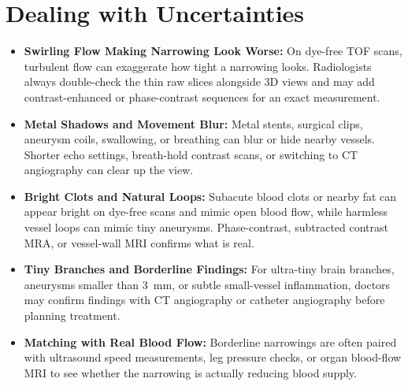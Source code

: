 \section{Dealing with Uncertainties}
\begin{itemize}
\item \textbf{Swirling Flow Making Narrowing Look Worse:} On dye-free TOF scans, turbulent flow can exaggerate how tight a narrowing looks. Radiologists always double-check the thin raw slices alongside 3D views and may add contrast-enhanced or phase-contrast sequences for an exact measurement.
\item \textbf{Metal Shadows and Movement Blur:} Metal stents, surgical clips, aneurysm coils, swallowing, or breathing can blur or hide nearby vessels. Shorter echo settings, breath-hold contrast scans, or switching to CT angiography can clear up the view.
\item \textbf{Bright Clots and Natural Loops:} Subacute blood clots or nearby fat can appear bright on dye-free scans and mimic open blood flow, while harmless vessel loops can mimic tiny aneurysms. Phase-contrast, subtracted contrast MRA, or vessel-wall MRI confirms what is real.
\item \textbf{Tiny Branches and Borderline Findings:} For ultra-tiny brain branches, aneurysms smaller than 3~mm, or subtle small-vessel inflammation, doctors may confirm findings with CT angiography or catheter angiography before planning treatment.
\item \textbf{Matching with Real Blood Flow:} Borderline narrowings are often paired with ultrasound speed measurements, leg pressure checks, or organ blood-flow MRI to see whether the narrowing is actually reducing blood supply.
\end{itemize}

